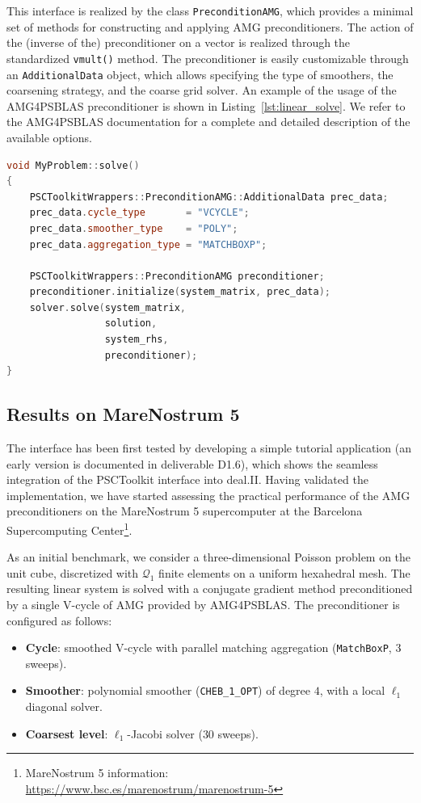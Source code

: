 \documentclass[a4paper,12pt]{article}
\begin{document}
This interface is realized by the class \texttt{PreconditionAMG}, which provides
a minimal set of methods for constructing and applying AMG preconditioners. The action of
the (inverse of the) preconditioner on a vector is realized through the standardized \texttt{vmult()} method. The preconditioner is easily customizable through an \texttt{AdditionalData} object, which allows specifying the
type of smoothers, the coarsening strategy, and the coarse grid solver. An example of the usage of the AMG4PSBLAS preconditioner is shown in Listing~\ref{lst:linear_solve}.
We refer to the AMG4PSBLAS documentation for a complete and detailed description of the available options.

\begin{lstlisting}[language=C++,caption={Preconditioned conjugate gradient solver class with PSCToolkit wrappers.}, label=lst:linear_solve]
void MyProblem::solve()
{
    PSCToolkitWrappers::PreconditionAMG::AdditionalData prec_data;
    prec_data.cycle_type       = "VCYCLE";
    prec_data.smoother_type    = "POLY";
    prec_data.aggregation_type = "MATCHBOXP";

    PSCToolkitWrappers::PreconditionAMG preconditioner;
    preconditioner.initialize(system_matrix, prec_data);
    solver.solve(system_matrix,
                 solution,
                 system_rhs,
                 preconditioner);
}
\end{lstlisting}

\subsection{Results on MareNostrum 5}

The interface has been first tested by developing a simple tutorial application (an early version is
documented in deliverable D1.6), which shows the seamless integration of the PSCToolkit interface into deal.II. Having validated the implementation, we have
started assessing the practical performance of the AMG preconditioners on the MareNostrum 5 supercomputer
at the Barcelona Supercomputing Center\footnote{MareNostrum 5 information: \url{https://www.bsc.es/marenostrum/marenostrum-5}}.

As an initial benchmark, we consider a three-dimensional Poisson problem on the unit cube, discretized
with $\mathcal{Q}_1$ finite elements on a uniform hexahedral mesh. The resulting linear system is solved with a conjugate
gradient method preconditioned by a single V-cycle of AMG provided by AMG4PSBLAS. The preconditioner is configured
as follows:
\begin{itemize}
    \item \textbf{Cycle}: smoothed V-cycle with parallel matching aggregation (\texttt{MatchBoxP}, $3$ sweeps).
    \item \textbf{Smoother}: polynomial smoother (\texttt{CHEB\_1\_OPT}) of degree $4$, with a local $\ell_1$ diagonal solver.
    \item \textbf{Coarsest level}: $\ell_1$-Jacobi solver ($30$ sweeps).
\end{itemize}
\end{document}
